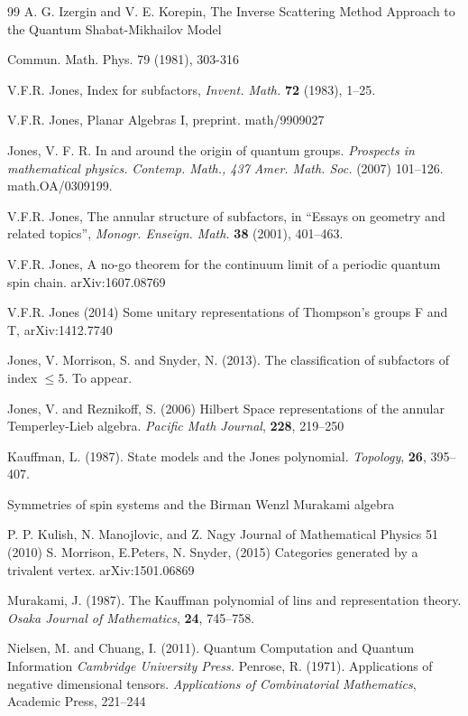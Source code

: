 \documentclass[11pt]{amsart}
\newcommand{\1}{\mathcal I}
\newcommand{\5}{\vskip 5pt}
\begin{document}
\begin{thebibliography}{99}
 A. G. Izergin and V. E. Korepin,
The Inverse Scattering Method Approach to the Quantum
Shabat-Mikhailov Model

 Commun. Math. Phys. 79 (1981), 303-316

V.F.R. Jones, Index for subfactors, 
{\em Invent. Math.} {\bf 72} (1983), 1--25.

V.F.R. Jones, Planar Algebras I, preprint.
	math/9909027

Jones, V. F. R.
In and around the origin of quantum groups.
{\em Prospects in mathematical physics.} 
 {\em Contemp. Math., 437    Amer. Math. Soc.}  (2007) 101--126.
math.OA/0309199.


V.F.R. Jones, The annular structure of subfactors, 
in ``Essays on geometry and related topics'', {\em Monogr. Enseign. Math.} {\bf 38} (2001), 401--463.

V.F.R. Jones, A no-go theorem for the continuum limit of a periodic quantum spin chain. 
arXiv:1607.08769

V.F.R. Jones (2014)
Some unitary representations of Thompson's groups F and T,
arXiv:1412.7740 

Jones, V. Morrison, S. and Snyder, N. (2013).
The classification of subfactors of index $\leq 5$.
To appear.

 Jones, V. and Reznikoff, S. (2006)
Hilbert Space representations of the annular 
          Temperley-Lieb algebra.
{\em Pacific Math Journal}, {\bf 228}, 219--250



Kauffman, L. (1987).
State models and the Jones polynomial.
{\em Topology}, {\bf 26}, 395--407.

Symmetries of spin systems and  the Birman Wenzl Murakami algebra

P. P. Kulish, N. Manojlovic, and Z. Nagy
Journal of Mathematical Physics 51 (2010)
 S. Morrison, E.Peters, N. Snyder, (2015)
 Categories generated by a trivalent vertex.
arXiv:1501.06869

Murakami, J. (1987).
The Kauffman polynomial of lins and representation theory.
{\em Osaka Journal of Mathematics}, {\bf 24}, 745--758.

Nielsen, M.  and Chuang, I.  (2011).
Quantum Computation and Quantum Information
{\em Cambridge University Press.}
Penrose, R. (1971).
Applications of negative dimensional tensors.
{\em Applications of Combinatorial Mathematics}, Academic Press, 221--244




\end{thebibliography}
\end{document}
